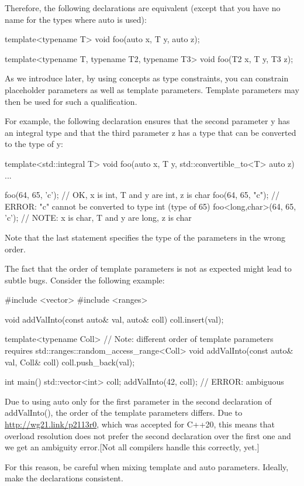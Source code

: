 Therefore, the following declarations are equivalent (except that you have no name for the types where auto is used):

\begin{cpp}
template<typename T>
void foo(auto x, T y, auto z);

template<typename T, typename T2, typename T3>
void foo(T2 x, T y, T3 z);
\end{cpp}

As we introduce later, by using concepts as type constraints, you can constrain placeholder parameters as well as template parameters. Template parameters may then be used for such a qualification.

For example, the following declaration ensures that the second parameter y has an integral type and that the third parameter z has a type that can be converted to the type of y:

\begin{cpp}
template<std::integral T>
void foo(auto x, T y, std::convertible_to<T> auto z)
{
	...
}

foo(64, 65, 'c'); // OK, x is int, T and y are int, z is char
foo(64, 65, "c"); // ERROR: "c" cannot be converted to type int (type of 65)
foo<long,char>(64, 65, 'c'); // NOTE: x is char, T and y are long, z is char
\end{cpp}

Note that the last statement specifies the type of the parameters in the wrong order.

The fact that the order of template parameters is not as expected might lead to subtle bugs. Consider the following example:


\begin{cpp}
#include <vector>
#include <ranges>

void addValInto(const auto& val, auto& coll)
{
	coll.insert(val);
}

template<typename Coll> // Note: different order of template parameters
requires std::ranges::random_access_range<Coll>
void addValInto(const auto& val, Coll& coll)
{
	coll.push_back(val);
}

int main()
{
	std::vector<int> coll;
	addValInto(42, coll); // ERROR: ambiguous
}
\end{cpp}

Due to using auto only for the first parameter in the second declaration of addValInto(), the order of the template parameters differs. Due to \url{http://wg21.link/p2113r0}, which was accepted for C++20, this means that overload resolution does not prefer the second declaration over the first one and we get an ambiguity error.[Not all compilers handle this correctly, yet.]

For this reason, be careful when mixing template and auto parameters. Ideally, make the declarations consistent.











